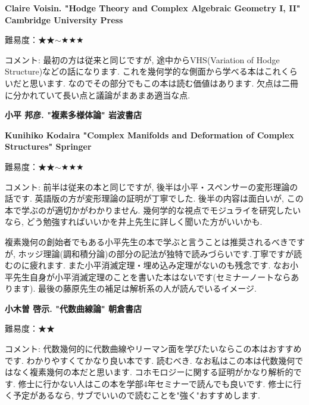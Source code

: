 \vspace{8pt}


\textbf{Claire Voisin. "Hodge Theory and Complex Algebraic Geometry I, II" Cambridge University Press}  \vspace{-6pt} 

難易度：★★$\sim$★★★ \vspace{-6pt} 

コメント: 最初の方は従来と同じですが, 途中からVHS(Variation of Hodge Structure)などの話になります. これを幾何学的な側面から学べる本はこれくらいだと思います. なのでその部分でもこの本は読む価値はあります. 欠点は二冊に分かれていて長い点と議論がまあまあ適当な点. %
\vspace{8pt}

\textbf{小平 邦彦. "複素多様体論" 岩波書店}\vspace{-6pt}

\textbf{Kunihiko Kodaira "Complex Manifolds and Deformation of Complex Structures" Springer} \vspace{-6pt}

難易度：★★$\sim$★★★ \vspace{-6pt} 

コメント:  前半は従来の本と同じですが, 後半は小平・スペンサーの変形理論の話です. 英語版の方が変形理論の証明が丁寧でした. 後半の内容は面白いが, この本で学ぶのが適切かがわかりません. 幾何学的な視点でモジュライを研究したいなら, どう勉強すればいいかを井上先生に詳しく聞いた方がいいかも. 

複素幾何の創始者でもある小平先生の本で学ぶと言うことは推奨されるべきですが, ホッジ理論(調和積分論)の部分の記法が独特で読みづらいです.丁寧ですが読むのに疲れます. また小平消滅定理・埋め込み定理がないのも残念です.  なお小平先生自身が小平消滅定理のことを書いた本はないです(セミナーノートならあります). 最後の藤原先生の補足は解析系の人が読んでいるイメージ. 
\vspace{8pt}

\textbf{小木曽 啓示. "代数曲線論" 朝倉書店}\vspace{-6pt}

難易度：★★ \vspace{-6pt} 

コメント: 代数幾何的に代数曲線やリーマン面を学びたいならこの本はおすすめです. わかりやすくてかなり良い本です. 読むべき. 
なお私はこの本は代数幾何ではなく複素幾何の本だと思います. コホモロジーに関する証明がかなり解析的です. 修士に行かない人はこの本を学部4年セミナーで読んでも良いです. 修士に行く予定があるなら, サブでいいので読むことを"強く"おすすめします. 
\vspace{8pt}

